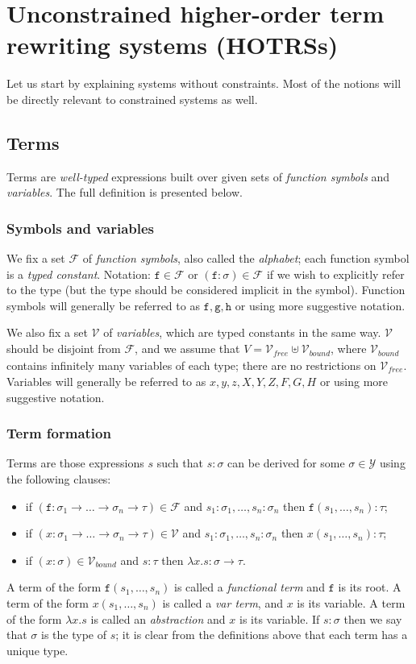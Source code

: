 \documentclass{lmcs}
\theoremstyle{theorem}\newtheorem{theorem}{Theorem}
\theoremstyle{theorem}\newtheorem{lemma}[theorem]{Lemma}
\theoremstyle{theorem}\newtheorem{corollary}[theorem]{Corollary}
\theoremstyle{definition}\newtheorem{definition}[theorem]{Definition}
\theoremstyle{definition}\newtheorem{example}[theorem]{Example}
\newcommand{\F}{\mathcal{F}}
\newcommand{\V}{\mathcal{V}}
\newcommand{\Vfree}{\mathcal{V}_{\mathit{free}}}
\newcommand{\Vbound}{\mathcal{V}_{\mathit{bound}}}
\newcommand{\Types}{\mathcal{Y}}
\newcommand{\atype}{\sigma}
\newcommand{\btype}{\tau}
\newcommand{\identifier}[1]{\mathtt{#1}}
\newcommand{\afun}{\identifier{f}}
\newcommand{\bfun}{\identifier{g}}
\newcommand{\cfun}{\identifier{h}}
\newcommand{\avar}{x}
\newcommand{\bvar}{y}
\newcommand{\cvar}{z}
\newcommand{\Avar}{X}
\newcommand{\Bvar}{Y}
\newcommand{\Cvar}{Z}
\newcommand{\AFvar}{F}
\newcommand{\BFvar}{G}
\newcommand{\CFvar}{H}
\newcommand{\abs}[2]{\lambda #1.#2}
\newcommand{\arrtype}{\rightarrow}
\newcommand{\mysubsection}[1]{\vspace{-12pt}\subsubsection{#1}}
\begin{document}
\section{Unconstrained higher-order term rewriting systems (HOTRSs)}

Let us start by explaining systems without constraints. Most of the notions will be directly
relevant to constrained systems as well.

\subsection{Terms}
Terms are \emph{well-typed} expressions built over given sets of \emph{function symbols} and
\emph{variables}. The full definition is presented below.

\mysubsection{Symbols and variables}

We fix a set $\F$ of \emph{function symbols}, also called the \emph{alphabet}; each function symbol
is a \emph{typed constant}. Notation: $\afun \in \F$ or $(\afun : \atype) \in \F$ if we wish to
explicitly refer to the type (but the type should be considered implicit in the symbol).
Function symbols will generally be referred to as $\afun,\bfun,\cfun$ or using more suggestive
notation.

We also fix a set $\V$ of \emph{variables}, which are typed constants in the same way.  $\V$ should
be disjoint from $\F$, and we assume that $V = \Vfree \uplus \Vbound$, where $\Vbound$ contains
infinitely many variables of each type; there are no restrictions on $\Vfree$.
Variables will generally be referred to as $\avar,\bvar,\cvar,\Avar,\Bvar,\Cvar,\AFvar,\BFvar,
\CFvar$ or using more suggestive notation.

\mysubsection{Term formation}

Terms are those expressions $s$ such that $s : \atype$ can be derived for some $\atype \in \Types$
using the following clauses:
\begin{itemize}
\item if $(\afun : \atype_1 \arrtype \dots \arrtype \atype_n \arrtype \btype) \in \F$ and
  $s_1 : \atype_1,\dots,s_n : \atype_n$ then $\afun(s_1,\dots,s_n) : \btype$;
\item if $(\avar : \atype_1 \arrtype \dots \arrtype \atype_n \arrtype \btype) \in \V$ and
  $s_1 : \atype_1,\dots,s_n : \atype_n$ then $\avar(s_1,\dots,s_n) : \btype$;
\item if $(\avar : \atype) \in \Vbound$ and $s : \btype$ then $\abs{\avar}{s} : \atype \arrtype
  \btype$.
\end{itemize}
A term of the form $\afun(s_1,\dots,s_n)$ is called a \emph{functional term} and $\afun$ is its
root.
A term of the form $\avar(s_1,\dots,s_n)$ is called a \emph{var term}, and $\avar$ is its variable.
A term of the form $\abs{\avar}{s}$ is called an \emph{abstraction} and $\avar$ is its variable.
If $s : \atype$ then we say that $\atype$ is the type of $s$; it is clear from the definitions
above that each term has a unique type.
\end{document}
